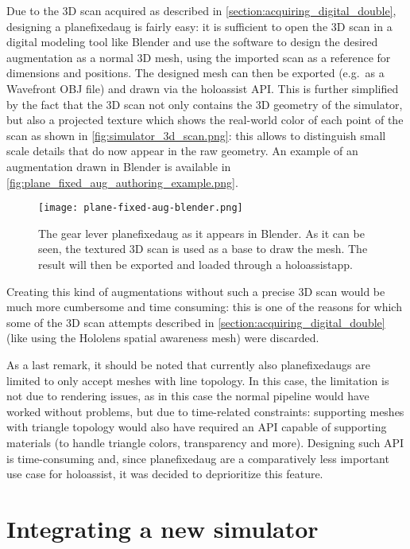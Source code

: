 Due to the 3D scan acquired as described in \autoref{section:acquiring_digital_double}, designing a \gls{planefixedaug} is fairly easy: it is sufficient to open the 3D scan in a digital modeling tool like Blender and use the software to design the desired augmentation as a normal 3D mesh, using the imported scan as a reference for dimensions and positions. The designed mesh can then be exported (e.g.\ as a Wavefront OBJ file\cite{japan_industrial_standards_microqr_nodate}) and drawn via the \gls{holoassist} \gls{API}. This is further simplified by the fact that the 3D scan not only contains the 3D geometry of the simulator, but also a projected texture which shows the real-world color of each point of the scan as shown in \autoref{fig:simulator_3d_scan.png}: this allows to distinguish small scale details that do now appear in the raw geometry. An example of an augmentation drawn in Blender is available in \autoref{fig:plane_fixed_aug_authoring_example.png}.

\begin{figure}
  \centering
  \texttt{[image: plane-fixed-aug-blender.png]}
  \caption{The gear lever \gls{planefixedaug} as it appears in Blender. As it can be seen, the textured 3D scan is used as a base to draw the mesh. The result will then be exported and loaded through a \gls{holoassistapp}.}\label{fig:plane_fixed_aug_authoring_example.png}
\end{figure}

Creating this kind of augmentations without such a precise 3D scan would be much more cumbersome and time consuming: this is one of the reasons for which some of the 3D scan attempts described in \autoref{section:acquiring_digital_double} (like using the Hololens spatial awareness mesh) were discarded.

As a last remark, it should be noted that currently also \glspl{planefixedaug} are limited to only accept meshes with line topology. In this case, the limitation is not due to rendering issues, as in this case the normal pipeline would have worked without problems, but due to time-related constraints: supporting meshes with triangle topology would also have required an \gls{API} capable of supporting materials (to handle triangle colors, transparency and more). Designing such \gls{API} is time-consuming and, since \gls{planefixedaug} are a comparatively less important use case for \gls{holoassist}, it was decided to deprioritize this feature.

\section{Integrating a new simulator}\label{sec:integrating_new_sim}


